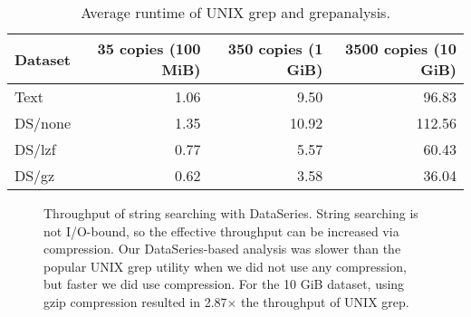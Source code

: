 \begin{table*}
\centering
\begin{tabular}{|l|r|r|r|}\hline

Dataset     & 35 copies (100 MiB) & 350 copies (1 GiB)  & 3500 copies (10 GiB) \\
\hline
Text        & 1.06  & 9.50  & 96.83     \\
DS/none 	& 1.35  & 10.92 & 112.56    \\
DS/lzf      & 0.77  & 5.57  & 60.43     \\
DS/gz       & 0.62  & 3.58  & 36.04     \\
\hline
\end{tabular}

\caption{Average runtime of UNIX grep and grepanalysis.}

\label{table:grep:runtime}
\end{table*}

\begin{figure}
\caption{Throughput of string searching with DataSeries. String searching is not I/O-bound, so the effective throughput can be increased via compression. Our DataSeries-based analysis was slower than the popular UNIX grep utility when we did not use any compression, but faster we did use compression. For the 10 GiB dataset, using gzip compression resulted in 2.87$\times$ the throughput of UNIX grep.}
\label{fig:grep:throughput}
\end{figure}

